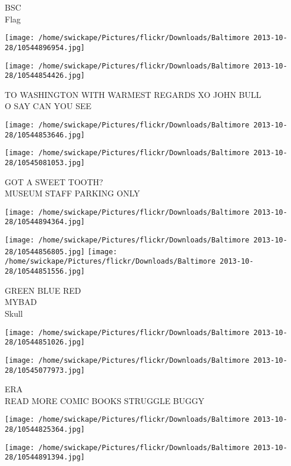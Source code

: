 \documentclass[10pt,letterpaper]{article}
\begin{document}
BSC\\
Flag
\pagebreak

\texttt{[image: /home/swickape/Pictures/flickr/Downloads/Baltimore 2013-10-28/10544896954.jpg]}

\vspace{0.25in}
\texttt{[image: /home/swickape/Pictures/flickr/Downloads/Baltimore 2013-10-28/10544854426.jpg]}

TO WASHINGTON WITH WARMEST REGARDS XO JOHN BULL\\
O SAY CAN YOU SEE
\pagebreak

\texttt{[image: /home/swickape/Pictures/flickr/Downloads/Baltimore 2013-10-28/10544853646.jpg]}

\vspace{0.25in}
\texttt{[image: /home/swickape/Pictures/flickr/Downloads/Baltimore 2013-10-28/10545081053.jpg]}

GOT A SWEET TOOTH?\\
MUSEUM STAFF PARKING ONLY
\pagebreak

\texttt{[image: /home/swickape/Pictures/flickr/Downloads/Baltimore 2013-10-28/10544894364.jpg]}

\vspace{0.25in}
\texttt{[image: /home/swickape/Pictures/flickr/Downloads/Baltimore 2013-10-28/10544856805.jpg]}
\texttt{[image: /home/swickape/Pictures/flickr/Downloads/Baltimore 2013-10-28/10544851556.jpg]}

GREEN BLUE RED\\
MYBAD\\
Skull
\pagebreak

\texttt{[image: /home/swickape/Pictures/flickr/Downloads/Baltimore 2013-10-28/10544851026.jpg]}

\vspace{0.25in}
\texttt{[image: /home/swickape/Pictures/flickr/Downloads/Baltimore 2013-10-28/10545077973.jpg]}

ERA\\
READ MORE COMIC BOOKS STRUGGLE BUGGY
\pagebreak

\texttt{[image: /home/swickape/Pictures/flickr/Downloads/Baltimore 2013-10-28/10544825364.jpg]}

\vspace{0.25in}
\texttt{[image: /home/swickape/Pictures/flickr/Downloads/Baltimore 2013-10-28/10544891394.jpg]}
\end{document}
